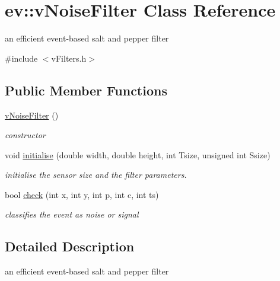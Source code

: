 \hypertarget{classev_1_1vNoiseFilter}{}\section{ev\+:\+:v\+Noise\+Filter Class Reference}
\label{classev_1_1vNoiseFilter}


an efficient event-\/based salt and pepper filter  




{\ttfamily \#include $<$v\+Filters.\+h$>$}

\subsection*{Public Member Functions}
\begin{DoxyCompactItemize}
\item 
\hyperlink{classev_1_1vNoiseFilter_a762260be3ee9eb0923fe08f906da975f}{v\+Noise\+Filter} ()\hypertarget{classev_1_1vNoiseFilter_a762260be3ee9eb0923fe08f906da975f}{}\label{classev_1_1vNoiseFilter_a762260be3ee9eb0923fe08f906da975f}

\begin{DoxyCompactList}\small\item\em constructor \end{DoxyCompactList}\item 
void \hyperlink{classev_1_1vNoiseFilter_af7c6cf000f7ed7193d160debac4e6879}{initialise} (double width, double height, int Tsize, unsigned int Ssize)\hypertarget{classev_1_1vNoiseFilter_af7c6cf000f7ed7193d160debac4e6879}{}\label{classev_1_1vNoiseFilter_af7c6cf000f7ed7193d160debac4e6879}

\begin{DoxyCompactList}\small\item\em initialise the sensor size and the filter parameters. \end{DoxyCompactList}\item 
bool \hyperlink{classev_1_1vNoiseFilter_a71ed5ded4f59d1c3180b0f5e5a021547}{check} (int x, int y, int p, int c, int ts)
\begin{DoxyCompactList}\small\item\em classifies the event as noise or signal \end{DoxyCompactList}\end{DoxyCompactItemize}


\subsection{Detailed Description}
an efficient event-\/based salt and pepper filter 

